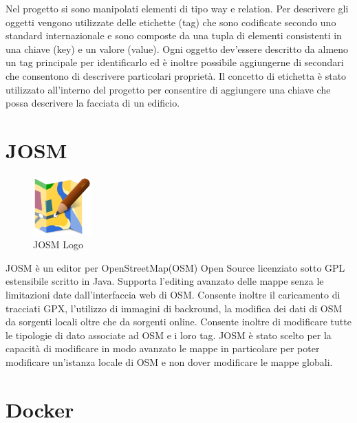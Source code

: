 Nel progetto si sono manipolati elementi di tipo way e relation.
Per descrivere gli oggetti vengono utilizzate delle etichette (tag) che sono codificate secondo uno standard internazionale e sono composte da una tupla di elementi consistenti in una chiave (key) e un valore (value). Ogni oggetto dev'essere descritto da almeno un tag  principale per identificarlo ed è inoltre possibile aggiungerne di secondari che consentono di descrivere particolari proprietà. Il concetto di etichetta è stato utilizzato all'interno del progetto per consentire di aggiungere una chiave che possa descrivere la facciata di un edificio.

\section{JOSM}
\label{sez:JOSM}

\begin{figure}
    \vspace{-20pt}
        \begin{center}
            \includegraphics[width=0.2\textwidth]{Immagini/logoJOSM.png}
        \end{center}
    \vspace{-20pt}
    \caption{JOSM Logo}
\label{fig:JOSMLogo}
\end{figure}

JOSM\cite{josm} è un editor per OpenStreetMap(OSM) Open Source licenziato sotto GPL estensibile scritto in Java. Supporta l'editing avanzato delle mappe senza le limitazioni date dall'interfaccia web di OSM.
Consente inoltre il caricamento di tracciati GPX, l'utilizzo di immagini di backround, la modifica dei dati di OSM da sorgenti locali oltre che da sorgenti online. Consente inoltre di modificare tutte le tipologie di dato associate ad OSM e i loro tag.\newline
JOSM è stato scelto per la capacità di modificare in modo avanzato le mappe in particolare per poter modificare un'istanza locale di OSM e non dover modificare le mappe globali. 

\section{Docker}
\label{sez:Docker}

